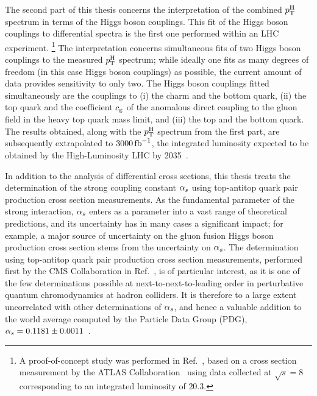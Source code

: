 The second part of this thesis concerns the interpretation of the combined $p_\mathrm{T}^\mathrm{H}$ spectrum in terms of the Higgs boson couplings.
% 
This fit of the Higgs boson couplings to differential spectra is the first one performed within an LHC experiment.%
% 
\footnote{%
A proof-of-concept study was performed in Ref.~\cite{Bishara:2016jga}, based on a cross section measurement by the ATLAS Collaboration~\cite{Aad:2015lha} using data collected at $\sqrt{s}=8$\TeV corresponding to an integrated luminosity of $20.3$\fbinv.%
}
% 
The interpretation concerns simultaneous fits of two Higgs boson couplings to the measured $p_\mathrm{T}^\mathrm{H}$ spectrum; while ideally one fits as many degrees of freedom (in this case Higgs boson couplings) as possible, the current amount of data provides sensitivity to only two.
% 
The Higgs boson couplings fitted simultaneously are the couplings to (i) the charm and the bottom quark, (ii) the top quark and the coefficient $c_\mathrm{g}$ of the anomalous direct coupling to the gluon field in the heavy top quark mass limit, and (iii) the top and the bottom quark.
% 
The results obtained, along with the $p_\mathrm{T}^\mathrm{H}$ spectrum from the first part, are subsequently extrapolated to $3000\,\text{fb}^{-1}$, the integrated luminosity expected to be obtained by the High-Luminosity LHC by 2035~\cite{hllhc}.


In addition to the analysis of differential cross sections, this thesis treats the determination of the strong coupling constant $\alpha_s$ using top-antitop quark pair production cross section measurements.
% 
As the fundamental parameter of the strong interaction, $\alpha_s$ enters as a parameter into a vast range of theoretical predictions, and its uncertainty has in many cases a significant impact; for example, a major source of uncertainty on the gluon fusion Higgs boson production cross section stems from the uncertainty on $\alpha_s$.
% 
The determination using top-antitop quark pair production cross section measurements, performed first by the CMS Collaboration in Ref.~\cite{Chatrchyan:2013haa}, is of particular interest, as it is one of the few determinations possible at next-to-next-to-leading order in perturbative quantum chromodynamics at hadron colliders.
% 
It is therefore to a large extent uncorrelated with other determinations of $\alpha_s$, and hence a valuable addition to the world average computed by the Particle Data Group (PDG), $\alpha_s = 0.1181 \pm 0.0011$~\cite{pdg}.



